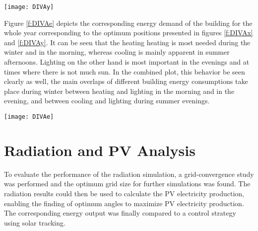 	\begin{figure*}
		\begin{center}
		\texttt{[image: DIVAy]}
		\caption{Carpet plots detailing the optimal azimuth angles to minimise the (a) heating demand, (b) cooling demand, (c) lighting demand, and (d) total building energy demand. Cooling is minimized by bocking the sun, whereas lighting and heating is minimized by opening the facade to let the insolation in.}
		\label{f:DIVAy}
		\end{center}
	\end{figure*}

	Figure \ref{f:DIVAe} depicts the corresponding energy demand of the building for the whole year corresponding to the optimum positions presented in figures \ref{f:DIVAx} and \ref{f:DIVAy}. It can be seen that the heating heating is most needed during the winter and in the morning, whereas cooling is mainly apparent in summer afternoons. Lighting on the other hand is most important in the evenings and at times where there is not much sun. In the combined plot, this behavior be seen clearly as well, the main overlaps of different building energy consumptions take place during winter between heating and lighting in the morning and in the evening, and between cooling and lighting during summer evenings. 

	\begin{figure*}
		\begin{center}
		\texttt{[image: DIVAe]}
		\caption{Carpet plots detailing the net energy consumption. Each square represents the total energy consumption for that specific hour of the entire month. Red colours detail the energy demand, while blue colours detail the energy supply.}
		\label{f:DIVAe}
		\end{center}
	\end{figure*}
	
\section{Radiation and PV Analysis}

	
	To evaluate the performance of the radiation simulation, a grid-convergence study was performed and the optimum grid size for further simulations was found. The radiation results could then be used to calculate the PV electricity production, enabling the finding of optimum angles to maximize PV electricity production. The corresponding energy output was finally compared to a control strategy using solar tracking.

